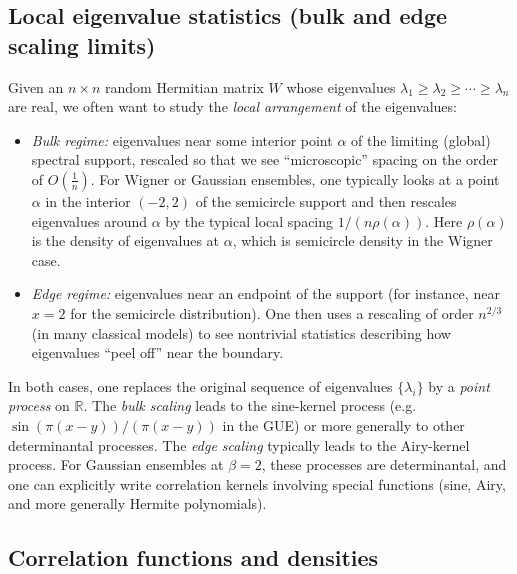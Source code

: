 \documentclass[letterpaper,11pt,oneside,reqno]{book}
\numberwithin{equation}{chapter}  %
\theoremstyle{definition}
\begin{document}
\subsection{Local eigenvalue statistics (bulk and edge scaling limits)}
\label{lecture4:subsec:local-stats-intro}

Given an \(n\times n\) random Hermitian matrix \(W\) whose eigenvalues
\(\lambda_1 \ge \lambda_2 \ge \cdots \ge \lambda_n\) are real,
we often want to study the \emph{local arrangement} of the eigenvalues:
\begin{itemize}
	\item \emph{Bulk regime:}
		eigenvalues near some interior point \(\alpha\)
		of the limiting (global) spectral support, rescaled so that we see
		``microscopic'' spacing on the order of \(O(\tfrac1n)\).
		For Wigner or Gaussian ensembles, one typically looks at a point
		\(\alpha\) in the interior \((-2,2)\) of the semicircle support
		and then rescales eigenvalues around \(\alpha\) by the typical local spacing \(1/(n\rho(\alpha))\). Here $\rho(\alpha)$ is the density of eigenvalues at \(\alpha\),
		which is semicircle density in the Wigner case.
	\item \emph{Edge regime:}
		eigenvalues near an endpoint of the support
		(for instance, near \(x=2\) for the semicircle distribution).
		One then uses a rescaling of order \(n^{2/3}\) (in many classical models)
		to see nontrivial statistics describing how eigenvalues ``peel off'' near the boundary.
\end{itemize}

In both cases, one replaces the original sequence of eigenvalues \(\{\lambda_i\}\) by
a \emph{point process} on \(\mathbb{R}\).  The \emph{bulk scaling} leads to the sine-kernel process (e.g.\ \(\sin(\pi(x-y))/(\pi(x-y))\) in the GUE) or more generally to other determinantal processes.
The \emph{edge scaling} typically leads to the Airy-kernel process.
For Gaussian ensembles at \(\beta=2\), these processes are determinantal, and one can explicitly
write correlation kernels involving special functions (sine, Airy, and more generally Hermite polynomials).

\subsection{Correlation functions and densities}
\label{lecture4:subsec:correlation-functions}
\end{document}
